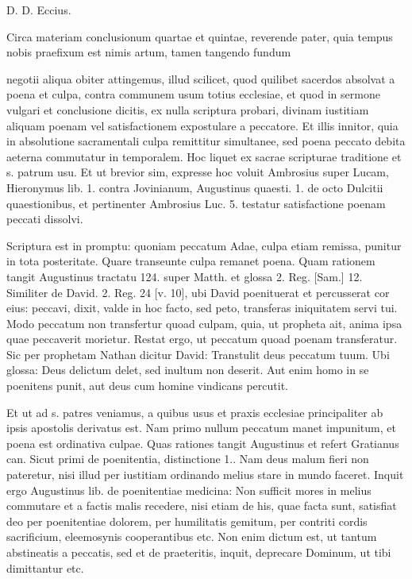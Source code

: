 D. D. Eccius.

Circa materiam conclusionum quartae et quintae, reverende pater, quia tempus nobis praefixum est nimis artum, tamen tangendo fundum

negotii aliqua obiter attingemus, illud scilicet, quod quilibet sacerdos absolvat a poena et culpa, contra communem usum totius ecclesiae, et quod in sermone vulgari et conclusione dicitis, ex nulla scriptura probari, divinam iustitiam aliquam poenam vel satisfactionem expostulare a peccatore. Et illis innitor, quia in absolutione sacramentali culpa remittitur simultanee, sed poena peccato debita aeterna commutatur in temporalem. Hoc liquet ex sacrae scripturae traditione et s. patrum usu. Et ut brevior sim, expresse hoc voluit Ambrosius super Lucam, Hieronymus lib. 1. contra Jovinianum, Augustinus quaesti. 1. de octo Dulcitii quaestionibus, et pertinenter Ambrosius Luc. 5. testatur satisfactione poenam peccati dissolvi.

Scriptura est in promptu: quoniam peccatum Adae, culpa etiam remissa, punitur in tota posteritate. Quare transeunte culpa remanet poena. Quam rationem tangit Augustinus tractatu 124. super Matth. et glossa 2. Reg. [Sam.] 12. Similiter de David. 2. Reg. 24 [v. 10], ubi David poenituerat et percusserat cor eius: peccavi, dixit, valde in hoc facto, sed peto, transferas iniquitatem servi tui. Modo peccatum non transfertur quoad culpam, quia, ut propheta ait, anima ipsa quae peccaverit morietur. Restat ergo, ut peccatum quoad poenam transferatur. Sic per prophetam Nathan dicitur David: Transtulit deus peccatum tuum. Ubi glossa: Deus delictum delet, sed inultum non deserit. Aut enim homo in se poenitens punit, aut deus cum homine vindicans percutit.

Et ut ad s. patres veniamus, a quibus usus et praxis ecclesiae principaliter ab ipsis apostolis derivatus est. Nam primo nullum peccatum manet impunitum, et poena est ordinativa culpae. Quas rationes tangit Augustinus et refert Gratianus can. Sicut primi de poenitentia, distinctione 1.. Nam deus malum fieri non pateretur, nisi illud per iustitiam ordinando melius stare in mundo faceret. Inquit ergo Augustinus lib. de poenitentiae medicina: Non sufficit mores in melius commutare et a factis malis recedere, nisi etiam de his, quae facta sunt, satisfiat deo per poenitentiae dolorem, per humilitatis gemitum, per contriti cordis sacrificium, eleemosynis cooperantibus etc. Non enim dictum est, ut tantum abstineatis a peccatis, sed et de praeteritis, inquit, deprecare Dominum, ut tibi dimittantur etc.

